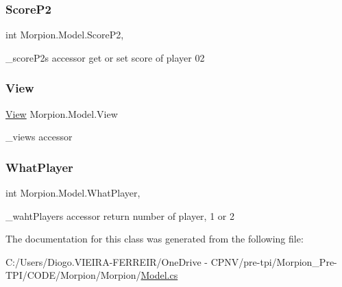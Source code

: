 \subsubsection{\texorpdfstring{Score\+P2}{ScoreP2}}
{\footnotesize\ttfamily int Morpion.\+Model.\+Score\+P2\hspace{0.3cm}{\ttfamily [get]}, {\ttfamily [set]}}



\+\_\+score\+P2\textquotesingle{}s accessor get or set score of player 02 

\mbox{\label{class_morpion_1_1_model_a9e23eaa776d26da2b6ef98aa5fb8db88}} 
\subsubsection{\texorpdfstring{View}{View}}
{\footnotesize\ttfamily \hyperlink{class_morpion_1_1_view}{View} Morpion.\+Model.\+View\hspace{0.3cm}{\ttfamily [set]}}



\+\_\+view\textquotesingle{}s accessor 

\mbox{\label{class_morpion_1_1_model_a56f84098c9bde669925d9a6850aaf061}} 
\subsubsection{\texorpdfstring{What\+Player}{WhatPlayer}}
{\footnotesize\ttfamily int Morpion.\+Model.\+What\+Player\hspace{0.3cm}{\ttfamily [get]}, {\ttfamily [set]}}



\+\_\+waht\+Player\textquotesingle{}s accessor return number of player, 1 or 2 



The documentation for this class was generated from the following file\+:\begin{DoxyCompactItemize}
\item 
C\+:/\+Users/\+Diogo.\+V\+I\+E\+I\+R\+A-\/\+F\+E\+R\+R\+E\+I\+R/\+One\+Drive -\/ C\+P\+N\+V/pre-\/tpi/\+Morpion\+\_\+\+Pre-\/\+T\+P\+I/\+C\+O\+D\+E/\+Morpion/\+Morpion/\hyperlink{_model_8cs}{Model.\+cs}\end{DoxyCompactItemize}
